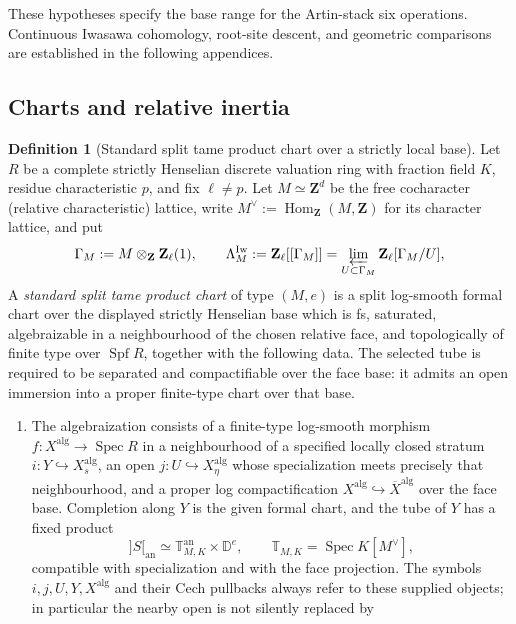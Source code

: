 \documentclass[11pt]{article}
\theoremstyle{definition}
\newtheorem{definition}[theorem]{Definition}
\theoremstyle{remark}
\begin{document}
These hypotheses specify the base range for the Artin-stack
six operations.  Continuous Iwasawa cohomology, root-site descent,
and geometric comparisons are established in the following appendices.

\subsection{Charts and relative inertia}

\begin{definition}[Standard split tame product chart over a strictly local base]
\label{def:frag-standard-product-chart}
Let $R$ be a complete strictly Henselian discrete valuation ring with
fraction field $K$, residue characteristic $p$, and fix $\ell\ne p$.  Let
$M\simeq\mathbf Z^d$ be the free cocharacter (relative characteristic)
lattice, write $M^\vee:=\operatorname{Hom}_{\mathbf Z}(M,\mathbf Z)$ for its
character lattice, and put
\[
  \Gamma_M:=M\otimes_{\mathbf Z}\mathbf Z_\ell(1),
  \qquad
  \Lambda_M^{\mathrm{Iw}}:=\mathbf Z_\ell[[\Gamma_M]]
  =\varprojlim_{U\subset\Gamma_M}\mathbf Z_\ell[\Gamma_M/U],
\]
A \emph{standard split tame product chart} of type $(M,e)$ is a
split log-smooth formal chart over the displayed strictly Henselian base which
is fs, saturated, algebraizable in a
neighbourhood of the chosen relative face, and topologically of finite type
over $\operatorname{Spf}R$, together with the following data.  The selected
tube is required to be separated and compactifiable over the face base:
it admits an open immersion into a proper finite-type chart over that base.
\begin{enumerate}[label=\textup{(\alph*)}]
\item The algebraization consists of a finite-type log-smooth morphism
  $f:X^{\mathrm{alg}}\to\operatorname{Spec}R$ in a neighbourhood of a
  specified locally closed stratum $i:Y\hookrightarrow X_s^{\mathrm{alg}}$,
  an open $j:U\hookrightarrow X_\eta^{\mathrm{alg}}$ whose specialization
  meets precisely that neighbourhood, and a proper log compactification
  $X^{\mathrm{alg}}\hookrightarrow\overline X^{\mathrm{alg}}$ over the face
  base.  Completion along $Y$ is the given formal chart, and the tube of $Y$
  has a fixed product
\[
  ]S[_{\mathrm{an}}
  \simeq \mathbb T_{M,K}^{\mathrm{an}}\times\mathbb D^e,
  \qquad \mathbb T_{M,K}=\operatorname{Spec}K[M^\vee],
\]
  compatible with specialization and with the face projection.  The symbols
  $i,j,U,Y,X^{\mathrm{alg}}$ and their Cech pullbacks always refer to these
  supplied objects; in particular the nearby open is not silently replaced by

\end{enumerate}
\end{definition}
\end{document}
